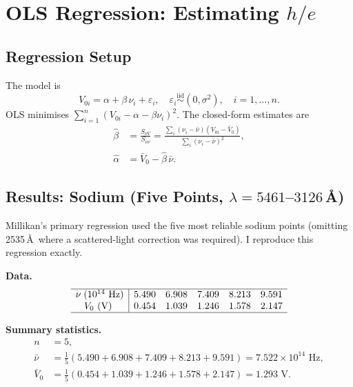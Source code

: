 \documentclass[12pt]{article}
\begin{document}
\section{OLS Regression: Estimating $h/e$}
\label{sec:regression}

\subsection{Regression Setup}

The model is
\[
  V_{0i} = \alpha + \beta\,\nu_i + \varepsilon_i,
  \quad \varepsilon_i \overset{\text{iid}}{\sim}(0,\sigma^2),
  \quad i = 1,\ldots,n.
\]
OLS minimises $\sum_{i=1}^{n}(V_{0i} - \alpha - \beta\nu_i)^2$.
The closed-form estimates are
\begin{align}
  \hat\beta &= \frac{S_{\nu V}}{S_{\nu\nu}}
    = \frac{\sum_i(\nu_i-\bar\nu)(V_{0i}-\bar V_0)}
           {\sum_i(\nu_i-\bar\nu)^2}, \label{eq:betahat}\\
  \hat\alpha &= \bar V_0 - \hat\beta\,\bar\nu. \label{eq:alphahat}
\end{align}

\subsection{Results: Sodium (Five Points, $\lambda = 5461$--$3126$\,\AA)}

Millikan's primary regression used the five most reliable sodium points
(omitting 2535\,\AA\ where a scattered-light correction was required).
I reproduce this regression exactly.

\medskip\noindent\textbf{Data.}
\[
\begin{array}{c|cccccc}
\hline
\nu\;(10^{14}\text{ Hz}) & 5.490 & 6.908 & 7.409 & 8.213 & 9.591 \\
V_0\text{ (V)           }& 0.454 & 1.039 & 1.246 & 1.578 & 2.147 \\
\hline
\end{array}
\]

\medskip\noindent\textbf{Summary statistics.}
\begin{align*}
  n &= 5, \\
  \bar\nu &= \tfrac{1}{5}(5.490 + 6.908 + 7.409 + 8.213 + 9.591)
           = 7.522\times10^{14}\text{ Hz}, \\
  \bar V_0 &= \tfrac{1}{5}(0.454+1.039+1.246+1.578+2.147)
            = 1.293\text{ V}.
\end{align*}
\end{document}
